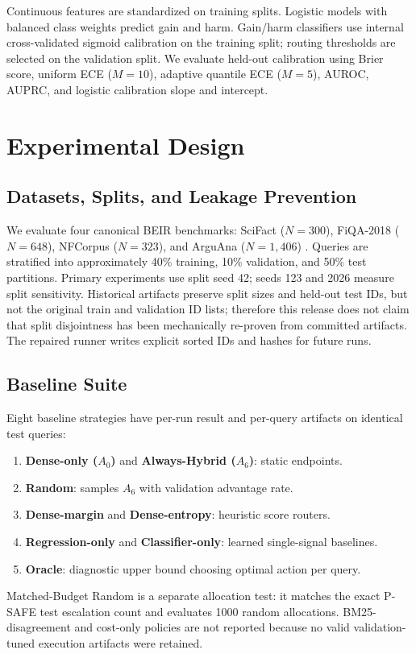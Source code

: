 \documentclass[10pt,journal]{IEEEtran}
\begin{document}
Continuous features are standardized on training splits. Logistic models with balanced class weights predict gain and harm. Gain/harm classifiers use internal cross-validated sigmoid calibration on the training split; routing thresholds are selected on the validation split. We evaluate held-out calibration using Brier score, uniform ECE ($M=10$), adaptive quantile ECE ($M=5$), AUROC, AUPRC, and logistic calibration slope and intercept.

\section{Experimental Design}
\label{sec:experiments}

\subsection{Datasets, Splits, and Leakage Prevention}
We evaluate four canonical BEIR benchmarks: SciFact ($N=300$), FiQA-2018 ($N=648$), NFCorpus ($N=323$), and ArguAna ($N=1,406$) \cite{thakur2021beir}. Queries are stratified into approximately 40\% training, 10\% validation, and 50\% test partitions. Primary experiments use split seed 42; seeds 123 and 2026 measure split sensitivity. Historical artifacts preserve split sizes and held-out test IDs, but not the original train and validation ID lists; therefore this release does not claim that split disjointness has been mechanically re-proven from committed artifacts. The repaired runner writes explicit sorted IDs and hashes for future runs.

\subsection{Baseline Suite}
Eight baseline strategies have per-run result and per-query artifacts on identical test queries:
\begin{enumerate}
    \item \textbf{Dense-only ($A_0$)} and \textbf{Always-Hybrid ($A_6$)}: static endpoints.
    \item \textbf{Random}: samples $A_6$ with validation advantage rate.
    \item \textbf{Dense-margin} and \textbf{Dense-entropy}: heuristic score routers.
    \item \textbf{Regression-only} and \textbf{Classifier-only}: learned single-signal baselines.
    \item \textbf{Oracle}: diagnostic upper bound choosing optimal action per query.
\end{enumerate}
Matched-Budget Random is a separate allocation test: it matches the exact P-SAFE test escalation count and evaluates 1000 random allocations. BM25-disagreement and cost-only policies are not reported because no valid validation-tuned execution artifacts were retained.
\end{document}
